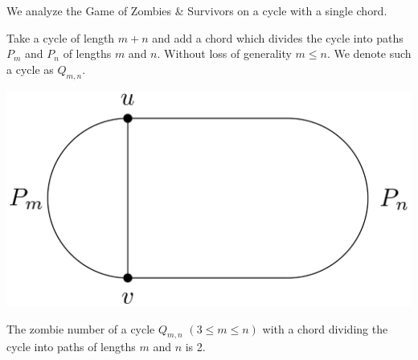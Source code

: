 We analyze the Game of Zombies \& Survivors on a cycle with a single chord.

\begin{definition}
 Take a cycle of length $m+n$ and add a chord which
 divides the cycle into paths $P_m$ and $P_n$ of lengths $m$ and $n$.
 Without loss of generality $m \leq n$. We denote such a cycle as $Q_{m,n}$.
\end{definition}

\begin{center}
 \includegraphics[scale=0.15]{q_m_n/Q_m_n_basic}
\end{center}

\begin{theorem}
 The zombie number of a cycle $Q_{m,n}$  $(3 \leq m \leq n)$ with
 a chord dividing the cycle into paths of lengths $m$ and $n$ is 2.
\end{theorem}

